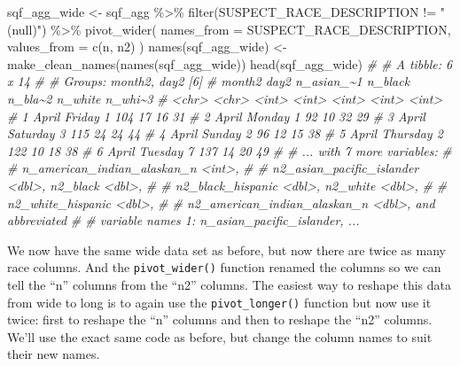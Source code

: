 \documentclass[
]{krantz}
\makeatletter
\newenvironment{Shaded}{\begin{snugshade}}{\end{snugshade}}
\newcommand{\AttributeTok}[1]{\textcolor[rgb]{0.61,0.61,0.61}{#1}}
\newcommand{\CommentTok}[1]{\textcolor[rgb]{0.37,0.37,0.37}{\textit{#1}}}
\newcommand{\FunctionTok}[1]{\textcolor[rgb]{0,0,0}{#1}}
\newcommand{\NormalTok}[1]{#1}
\newcommand{\OtherTok}[1]{\textcolor[rgb]{0.37,0.37,0.37}{#1}}
\newcommand{\SpecialCharTok}[1]{\textcolor[rgb]{0,0,0}{#1}}
\newcommand{\StringTok}[1]{\textcolor[rgb]{0.5,0.5,0.5}{#1}}
\newenvironment{kframe}{%
\medskip{}
\setlength{\fboxsep}{.8em}
 \def\at@end@of@kframe{}%
 \ifinner\ifhmode%
  \def\at@end@of@kframe{\end{minipage}}%
  \begin{minipage}{\columnwidth}%
 \fi\fi%
 \def\FrameCommand##1{\hskip\@totalleftmargin \hskip-\fboxsep
 \colorbox{shadecolor}{##1}\hskip-\fboxsep
     \hskip-\linewidth \hskip-\@totalleftmargin \hskip\columnwidth}%
 \MakeFramed {\advance\hsize-\width
   \@totalleftmargin\z@ \linewidth\hsize
   \@setminipage}}%
 {\par\unskip\endMakeFramed%
 \at@end@of@kframe}
\renewenvironment{Shaded}{\begin{kframe}}{\end{kframe}}
\makeatother
\begin{document}
\begin{Shaded}
\begin{Highlighting}[]
\NormalTok{sqf\_agg\_wide }\OtherTok{\textless{}{-}}\NormalTok{ sqf\_agg }\SpecialCharTok{\%\textgreater{}\%}
  \FunctionTok{filter}\NormalTok{(SUSPECT\_RACE\_DESCRIPTION }\SpecialCharTok{!=} \StringTok{"(null)"}\NormalTok{) }\SpecialCharTok{\%\textgreater{}\%}
  \FunctionTok{pivot\_wider}\NormalTok{(}
    \AttributeTok{names\_from =}\NormalTok{ SUSPECT\_RACE\_DESCRIPTION,}
    \AttributeTok{values\_from =} \FunctionTok{c}\NormalTok{(n, n2)}
\NormalTok{  )}
\FunctionTok{names}\NormalTok{(sqf\_agg\_wide) }\OtherTok{\textless{}{-}} \FunctionTok{make\_clean\_names}\NormalTok{(}\FunctionTok{names}\NormalTok{(sqf\_agg\_wide))}
\FunctionTok{head}\NormalTok{(sqf\_agg\_wide)}
\CommentTok{\# \# A tibble: 6 x 14}
\CommentTok{\# \# Groups:   month2, day2 [6]}
\CommentTok{\#   month2 day2     n\_asian\_\textasciitilde{}1 n\_black n\_bla\textasciitilde{}2 n\_white n\_whi\textasciitilde{}3}
\CommentTok{\#   \textless{}chr\textgreater{}  \textless{}chr\textgreater{}         \textless{}int\textgreater{}   \textless{}int\textgreater{}   \textless{}int\textgreater{}   \textless{}int\textgreater{}   \textless{}int\textgreater{}}
\CommentTok{\# 1 April  Friday            1     104      17      16      31}
\CommentTok{\# 2 April  Monday            1      92      10      32      29}
\CommentTok{\# 3 April  Saturday          3     115      24      24      44}
\CommentTok{\# 4 April  Sunday            2      96      12      15      38}
\CommentTok{\# 5 April  Thursday          2     122      10      18      38}
\CommentTok{\# 6 April  Tuesday           7     137      14      20      49}
\CommentTok{\# \# ... with 7 more variables:}
\CommentTok{\# \#   n\_american\_indian\_alaskan\_n \textless{}int\textgreater{},}
\CommentTok{\# \#   n2\_asian\_pacific\_islander \textless{}dbl\textgreater{}, n2\_black \textless{}dbl\textgreater{},}
\CommentTok{\# \#   n2\_black\_hispanic \textless{}dbl\textgreater{}, n2\_white \textless{}dbl\textgreater{},}
\CommentTok{\# \#   n2\_white\_hispanic \textless{}dbl\textgreater{},}
\CommentTok{\# \#   n2\_american\_indian\_alaskan\_n \textless{}dbl\textgreater{}, and abbreviated}
\CommentTok{\# \#   variable names 1: n\_asian\_pacific\_islander, ...}
\end{Highlighting}
\end{Shaded}

We now have the same wide data set as before, but now there
are twice as many race columns. And the
\texttt{pivot\_wider()} function renamed the columns so we
can tell the ``n'' columns from the ``n2'' columns. The
easiest way to reshape this data from wide to long is to
again use the \texttt{pivot\_longer()} function but now use
it twice: first to reshape the ``n'' columns and then to
reshape the ``n2'' columns. We'll use the exact same code as
before, but change the column names to suit their new names.
\end{document}
